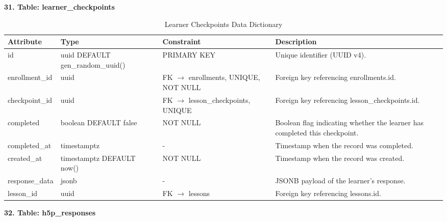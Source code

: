 \documentclass[12pt, oneside]{article} %
\newcommand{\tabbreak}{\hyphenpenalty=200\exhyphenpenalty=200\tolerance=4000\hbadness=10000\hspace{0pt}}
\begin{document}
\textbf{31. Table: learner\_checkpoints}

\begin{table}[H]
\caption{Learner Checkpoints Data Dictionary}
\label{tab:dd_learner_checkpoints}
\vspace{-4mm}
\begin{center}
\renewcommand{\arraystretch}{1.15}
\scriptsize
\begin{tabular}{|>{\raggedright\arraybackslash\tabbreak}p{2.67cm}|>{\raggedright\arraybackslash\tabbreak}p{2.93cm}|>{\raggedright\arraybackslash\tabbreak}p{2.67cm}|>{\raggedright\arraybackslash\tabbreak}p{4.51cm}|}
\hline
\textbf{Attribute} & \textbf{Type} & \textbf{Constraint} & \textbf{Description} \\ \hline
id & uuid DEFAULT gen\_random\_uuid() & PRIMARY KEY & Unique identifier (UUID v4). \\ \hline
enrollment\_id & uuid & FK $\rightarrow$ enrollments, UNIQUE, NOT NULL & Foreign key referencing enrollments.id. \\ \hline
checkpoint\_id & uuid & FK $\rightarrow$ lesson\_checkpoints, UNIQUE & Foreign key referencing lesson\_checkpoints.id. \\ \hline
completed & boolean DEFAULT false & NOT NULL & Boolean flag indicating whether the learner has completed this checkpoint. \\ \hline
completed\_at & timestamptz & - & Timestamp when the record was completed. \\ \hline
created\_at & timestamptz DEFAULT now() & NOT NULL & Timestamp when the record was created. \\ \hline
response\_data & jsonb & - & JSONB payload of the learner's response. \\ \hline
lesson\_id & uuid & FK $\rightarrow$ lessons & Foreign key referencing lessons.id. \\ \hline
\end{tabular}
\end{center}
\end{table}

\textbf{32. Table: h5p\_responses}
\end{document}
